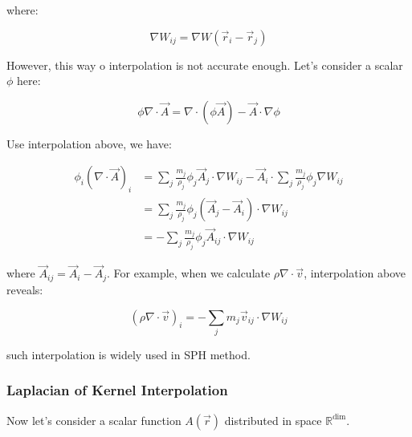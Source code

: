 \documentclass[10pt, oneside]{article}
\begin{document}
where:

\begin{equation}
    \nabla W_{ij} = \nabla W(\vec{r}_i - \vec{r}_j)
\end{equation}

However, this way o interpolation is not accurate enough. 
Let's consider a scalar $\phi$ here:

\begin{equation}
    \phi \nabla\cdot \vec{A} = \nabla\cdot(\phi \vec{A}) - \vec{A}\cdot\nabla\phi
\end{equation}

Use interpolation above, we have:

\begin{equation}
    \begin{aligned}
        \phi_i (\nabla\cdot \vec{A})_i &= 
            \sum_j \frac{m_j}{\rho_j} \phi_j \vec{A}_j \cdot \nabla W_{ij} -
            \vec{A}_i\cdot\sum_j \frac{m_j}{\rho_j}  \phi_j \nabla W_{ij}\\
            &=
            \sum_j \frac{m_j}{\rho_j} \phi_j (\vec{A}_j-\vec{A}_i) \cdot \nabla W_{ij}\\
            &=
            -\sum_j \frac{m_j}{\rho_j} \phi_j \vec{A}_{ij} \cdot \nabla W_{ij}
    \end{aligned}
\end{equation}

where $\vec{A}_{ij} = \vec{A}_i - \vec{A}_j$. 
For example, when we calculate $\rho \nabla\cdot\vec{v}$, interpolation above reveals:

\begin{equation}
    (\rho \nabla\cdot \vec{v})_i = -\sum_j m_j \vec{v}_{ij} \cdot \nabla W_{ij}
\end{equation}

such interpolation is widely used in SPH method.

\subsubsection{Laplacian of Kernel Interpolation}

Now let's consider a scalar function $A(\vec{r})$ distributed in space $\mathbb{R}^\text{dim}$.
\end{document}
